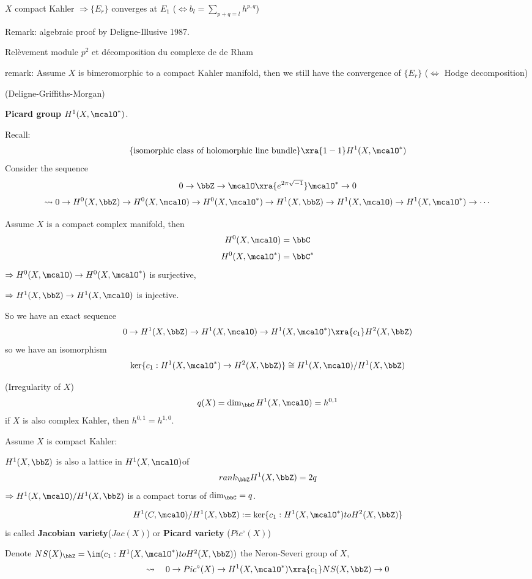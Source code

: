 \begin{thm} $X$ compact Kahler $\Rightarrow\{E_r\}$ converges at $E_1$
($\iff b_l=\sum\limits_{p+q=l}h^{p,q}$)
\end{thm}

Remark: algebraic proof by Deligne-Illusive 1987.

Rel\`{e}vement module $p^2$ et d\'{e}composition du complexe de de Rham

remark: Assume $X$ is bimeromorphic to a compact Kahler manifold,
then we still have the convergence of $\{E_r\}$
($\iff$ Hodge decomposition)

(Deligne-Griffiths-Morgan)

\textbf{Picard group $H^1(X,\mcalO^*)$}.

Recall:  
$$\{\text{isomorphic class of holomorphic line bundle}\}
\xra{1-1} H^1(X,\mcalO^*)$$
Consider the sequence 
$$0\to\bbZ\to\mcalO\xra{e^{2\pi\sqrt{-1}}}\mcalO^*\to 0$$
$$
  \rightsquigarrow
  0\to H^0(X,\bbZ)\to H^0(X,\mcalO)\to H^0(X,\mcalO^*)
  \to H^1(X,\bbZ)\to H^1(X,\mcalO)\to H^1(X,\mcalO^*)\to\cdots
$$

Assume $X$ is a compact complex manifold, then
$$H^0(X,\mcalO)=\bbC$$
$$H^0(X,\mcalO^*)=\bbC^*$$
$\Rightarrow H^0(X,\mcalO)\to H^0(X,\mcalO^*)$ is surjective,

$\Rightarrow H^1(X,\bbZ)\to H^1(X,\mcalO)$ is injective. 

So we have an exact sequence
$$
  0\to H^1(X,\bbZ)\to H^1(X,\mcalO)
  \to H^1(X,\mcalO^*)\xra{c_1}H^2(X,\bbZ)
$$
so we have an isomorphism
$$\ker\{c_1:H^1(X,\mcalO^*)\to H^2(X,\bbZ)\}\cong H^1(X,\mcalO)/H^1(X,\bbZ)$$

\begin{definition}(Irregularity of $X$)
$$q(X)=\dim_{\bbC}H^1(X,\mcalO)
=h^{0,1}$$
if $X$ is also complex Kahler, then $h^{0,1}=h^{1,0}$.
\end{definition}

Assume $X$ is compact Kahler:

\begin{lemma}
$H^1(X,\bbZ)$ is also a lattice in $H^1(X,\mcalO)$of 
$$rank_{\bbZ}H^1(X,\bbZ)=2q$$
$\Rightarrow H^1(X,\mcalO)/H^1(X,\bbZ)$ is a 
compact torus of $\dim_{\bbC}=q$.
\end{lemma}
$$H^1(C,\mcalO)/H^1(X,\bbZ):=
\ker\{c_1:H^1(X,\mcalO^*)to H^2(X,\bbZ)\}$$
is called \textbf{Jacobian variety}($Jac(X)$) or \textbf{Picard variety}
($Pic^\circ(X)$)

Denote $NS(X)_{\bbZ}=\im(c_1:H^1(X,\mcalO^*)to H^2(X,\bbZ))$
the Neron-Severi group of $X$,
$$
  \rightsquigarrow\quad 
  0\to Pic^\circ(X)\to H^1(X,\mcalO^*)\xra{c_1}NS(X,\bbZ)\to 0
$$

